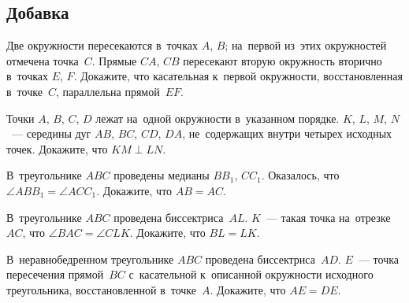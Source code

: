 


\subsection*{Добавка}


\begin{problems}

\item
Две окружности пересекаются в~точках $A$, $B$;
на~первой из~этих окружностей отмечена точка~$C$.
Прямые $CA$, $CB$ пересекают вторую окружность вторично в~точках $E$, $F$.
Докажите, что касательная к~первой окружности, восстановленная в~точке~$C$,
параллельна прямой~$EF$.

\item
Точки $A$, $B$, $C$, $D$ лежат на~одной окружности в~указанном порядке.
$K$, $L$, $M$, $N$~--- середины дуг $AB$, $BC$, $CD$, $DA$, не~содержащих
внутри четырех исходных точек.
Докажите, что $KM \perp LN$.

\item
В~треугольнике $ABC$ проведены медианы $B B_1$, $C C_1$.
Оказалось, что $\angle A B B_1 = \angle A C C_1$.
Докажите, что $AB = AC$.

\item
В~треугольнике $ABC$ проведена биссектриса~$AL$.
$K$~--- такая точка на~отрезке~$AC$, что $\angle BAC = \angle CLK$.
Докажите, что $BL = LK$.

\item
В~неравнобедренном треугольнике $ABC$ проведена биссектриса~$AD$.
$E$~--- точка пересечения прямой~$BC$ с~касательной к~описанной окружности
исходного треугольника, восстановленной в~точке~$A$.
Докажите, что $AE = DE$.

\end{problems}


